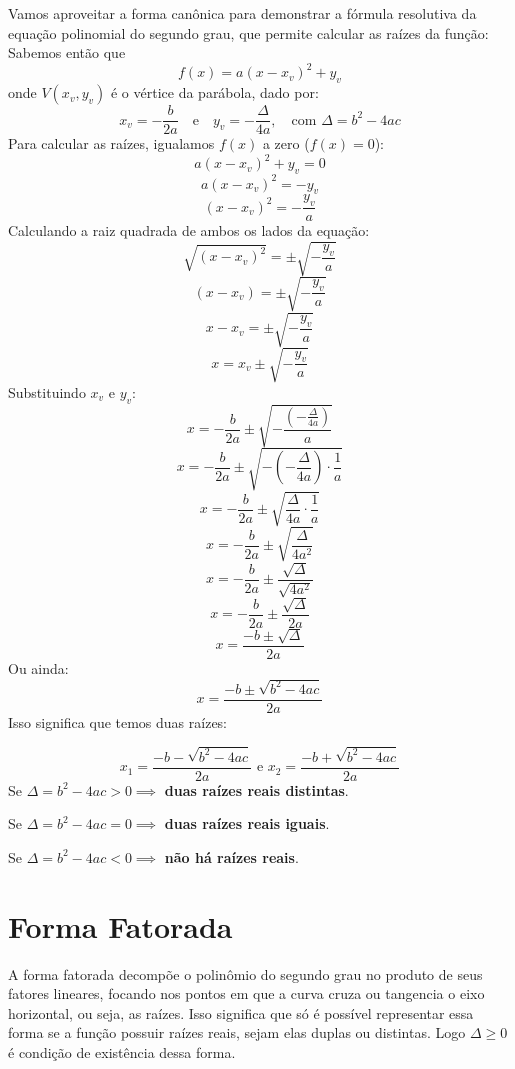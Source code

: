 \documentclass[12pt,a4paper]{report}
\begin{document}
	Vamos aproveitar a forma canônica para demonstrar a fórmula resolutiva da equação polinomial do segundo grau, que permite calcular as raízes da função:\\[0.5cm]
		Sabemos então que
	$$f(x) = a(x - x_v)^2 + y_v$$
	onde $V(x_v, y_v)$ é o vértice da parábola, dado por:
	$$x_v = -\frac{b}{2a} \quad \text{e} \quad y_v = -\frac{\Delta}{4a}, \quad \text{com } \Delta = b^2 - 4ac$$	
	Para calcular as raízes, igualamos $f(x)$ a zero ($f(x)=0$):
	$$a(x - x_v)^2 + y_v = 0$$
	$$a(x - x_v)^2 = - y_v$$
	$$(x - x_v)^2 = - \frac{y_v}{a}$$
	Calculando a raiz quadrada de ambos os lados da equação:
	$$\sqrt{(x - x_v)^2} = \pm \sqrt{- \frac{y_v}{a}}$$
	$$(x - x_v) = \pm \sqrt{-\frac{y_v}{a}}$$
	$$x - x_v = \pm \sqrt{-\frac{y_v}{a}}$$
	$$x  = x_v \pm \sqrt{-\frac{y_v}{a}}$$
	Substituindo $x_v$ e $y_v$:
	$$x  = -\frac{b}{2a} \pm \sqrt{-\frac{\left( -\frac{\Delta}{4a}\right) }{a}}$$
	$$x  = -\frac{b}{2a} \pm \sqrt{-\left( -\frac{\Delta}{4a}\right)  \cdot \frac{1}{a}}$$
	$$x  = -\frac{b}{2a} \pm \sqrt{\frac{\Delta}{4a} \cdot \frac{1}{a}}$$
	$$x  = -\frac{b}{2a} \pm \sqrt{\frac{\Delta}{4a^2}}$$
	$$x  = -\frac{b}{2a} \pm \frac{\sqrt{\Delta}}{\sqrt{4a^2}}$$
	$$x  = -\frac{b}{2a} \pm \frac{\sqrt{\Delta}}{2a}$$
	$$x  = \frac{-b \pm \sqrt{\Delta}}{2a}$$
	Ou ainda:
	$$x  = \frac{-b \pm \sqrt{b^2 - 4ac}}{2a}$$
	Isso significa que temos duas raízes:
	
	\begin{destaque}
		\label{dest:raizes}
		$$x_1  = \frac{-b - \sqrt{b^2 - 4ac}}{2a} \text{ e } x_2  = \frac{-b + \sqrt{b^2 - 4ac}}{2a}$$
		Se $\Delta = b^2 -4ac > 0 \implies $  \textbf{duas raízes reais distintas}.
		
		Se $\Delta = b^2 -4ac = 0 \implies $  \textbf{duas raízes reais iguais}.
		
		Se $\Delta = b^2 -4ac < 0 \implies $ \textbf{não há raízes reais}.
	\end{destaque}		
	
	\section{Forma Fatorada}
	\label{subsec:fatorada}
	
	A forma fatorada decompõe o polinômio do segundo grau no produto de seus fatores lineares, focando nos pontos em que a curva cruza ou tangencia o eixo horizontal, ou seja, as raízes. Isso significa que só é possível representar essa forma se a função possuir raízes reais, sejam elas duplas ou distintas. Logo $\Delta \geqslant 0$ é condição de existência dessa forma. 
	
\end{document}
